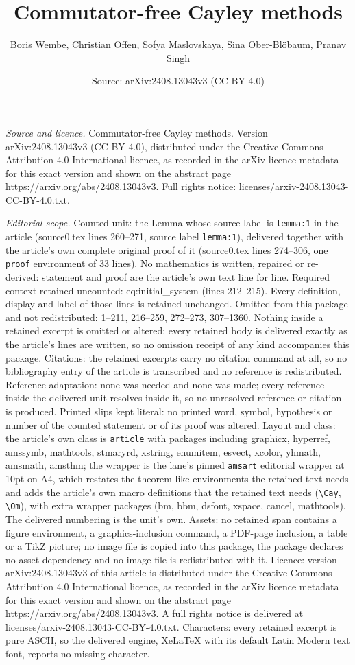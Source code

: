 \documentclass[10pt,a4paper]{amsart}
\title[Commutator-free Cayley methods]{Commutator-free Cayley methods}
\author{Boris Wembe, Christian Offen, Sofya Maslovskaya, Sina Ober-Bl\"obaum, Pranav Singh}
\date{Source: arXiv:2408.13043v3 (CC BY 4.0)}
\begin{document}
\maketitle

\noindent\emph{Source and licence.} Commutator-free Cayley methods. Version arXiv:2408.13043v3 (CC BY 4.0), distributed under the Creative Commons Attribution 4.0 International licence, as recorded in the arXiv licence metadata for this exact version and shown on the abstract page https://arxiv.org/abs/2408.13043v3. Full rights notice: licenses/arxiv-2408.13043-CC-BY-4.0.txt.\par\smallskip

\noindent\textit{Editorial scope.} Counted unit: the Lemma whose source label is \texttt{lemma:1} in the article (source0.tex lines 260--271, source label \texttt{lemma:1}), delivered together with the article's own complete original proof of it (source0.tex lines 274--306, one \texttt{proof} environment of 33 lines). No mathematics is written, repaired or re-derived: statement and proof are the article's own text line for line. Required context retained uncounted: eq:initial\_system (lines 212--215). Every definition, display and label of those lines is retained unchanged. Omitted from this package and not redistributed: 1--211, 216--259, 272--273, 307--1360. Nothing inside a retained excerpt is omitted or altered: every retained body is delivered exactly as the article's lines are written, so no omission receipt of any kind accompanies this package. Citations: the retained excerpts carry no citation command at all, so no bibliography entry of the article is transcribed and no reference is redistributed. Reference adaptation: none was needed and none was made; every reference inside the delivered unit resolves inside it, so no unresolved reference or citation is produced. Printed slips kept literal: no printed word, symbol, hypothesis or number of the counted statement or of its proof was altered. Layout and class: the article's own class is \texttt{article} with packages including graphicx, hyperref, amssymb, mathtools, stmaryrd, xstring, enumitem, esvect, xcolor, yhmath, amsmath, amsthm; the wrapper is the lane's pinned \texttt{amsart} editorial wrapper at 10pt on A4, which restates the theorem-like environments the retained text needs and adds the article's own macro definitions that the retained text needs (\texttt{\textbackslash Cay}, \texttt{\textbackslash Om}), with extra wrapper packages (bm, bbm, dsfont, xspace, cancel, mathtools). The delivered numbering is the unit's own. Assets: no retained span contains a figure environment, a graphics-inclusion command, a PDF-page inclusion, a table or a TikZ picture; no image file is copied into this package, the package declares no asset dependency and no image file is redistributed with it. Licence: version arXiv:2408.13043v3 of this article is distributed under the Creative Commons Attribution 4.0 International licence, as recorded in the arXiv licence metadata for this exact version and shown on the abstract page https://arxiv.org/abs/2408.13043v3. A full rights notice is delivered at licenses/arxiv-2408.13043-CC-BY-4.0.txt. Characters: every retained excerpt is pure ASCII, so the delivered engine, XeLaTeX with its default Latin Modern text font, reports no missing character.
\end{document}
